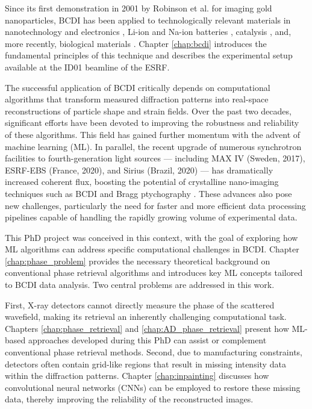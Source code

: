 Since its first demonstration in 2001 by Robinson et al. \cite{Robinson_gold_2001} for imaging gold nanoparticles, BCDI 
has been applied to technologically relevant materials in nanotechnology and electronics \cite{Favre-Nicolin_2010}, Li-ion 
and Na-ion batteries \cite{Singer2018, Serban2024}, catalysis \cite{atlan_imaging_2023}, and, more recently, biological 
materials \cite{Grunewald:ro5042}. Chapter \ref*{chap:bcdi} introduces the fundamental principles of this technique and 
describes the experimental setup available at the ID01 beamline of the ESRF.

The successful application of BCDI critically depends on computational algorithms that transform measured diffraction 
patterns into real-space reconstructions of particle shape and strain fields. Over the past two decades, significant 
efforts have been devoted to improving the robustness and reliability of these algorithms. This field has gained further 
momentum with the advent of machine learning (ML). In parallel, the recent upgrade of numerous synchrotron facilities 
to fourth-generation light sources — including MAX IV (Sweden, 2017), ESRF-EBS (France, 2020), and Sirius (Brazil, 2020) — 
has dramatically increased coherent flux, boosting the potential of crystalline nano-imaging techniques such as BCDI 
and Bragg ptychography \cite{Li2022, Leake:il5024}. These advances also pose new challenges, particularly the need 
for faster and more efficient data processing pipelines capable of handling the rapidly growing volume of experimental 
data.

This PhD project was conceived in this context, with the goal of exploring how ML algorithms can address specific 
computational challenges in BCDI. Chapter \ref{chap:phase_problem} provides the necessary theoretical background on 
conventional phase retrieval algorithms and introduces key ML concepts tailored to BCDI data analysis. Two central 
problems are addressed in this work.

First, X-ray detectors cannot directly measure the phase of the scattered wavefield, making its retrieval an inherently 
challenging computational task. Chapters \ref{chap:phase_retrieval} and \ref{chap:AD_phase_retrieval} present how ML-based 
approaches developed during this PhD can assist or complement conventional phase retrieval methods. Second, due to manufacturing 
constraints, detectors often contain grid-like regions that result in missing intensity data within the diffraction patterns. 
Chapter \ref{chap:inpainting} discusses how convolutional neural networks (CNNs) can be employed to restore these missing data, 
thereby improving the reliability of the reconstructed images.


